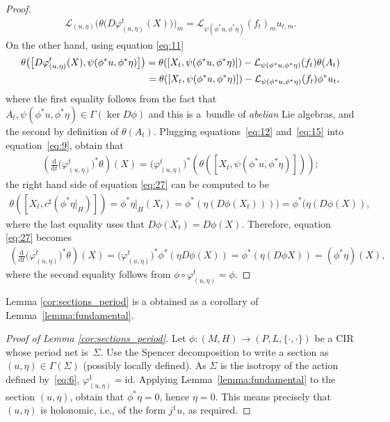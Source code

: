 \documentclass[pdftex]{sigma}
\numberwithin{equation}{section}
\newcommand{\de}{\mathrm{d}} %
\newcommand{\CM}{(M,H)} %
\begin{document}
\begin{proof}
 \begin{gather} \label{eq:12}
 \mathcal{L}_{(u,\eta)}\big( \theta\big(D \varphi^t_{(u,\eta)}(X)\big)\big)_m =\mathcal{L}_{\psi(\phi^*u,\phi^*\eta)}(f_t)_mu_{t,m}.
 \end{gather}
On the other hand, using equation \eqref{eq:11}
 \begin{gather}
\theta \big(\big[D\varphi^t_{(u,\eta)}(X), \psi(\phi^*u,\phi^*\eta)\big]\big) = \theta([X_t,\psi(\phi^*u,\phi^*\eta)]) - \mathcal{L}_{\psi(\phi^*u,\phi^*\eta)}(f_{t})\theta(A_{t})\nonumber\\
 \hphantom{\theta \big(\big[D\varphi^t_{(u,\eta)}(X), \psi(\phi^*u,\phi^*\eta)\big]\big)}{}
 = \theta([X_t,\psi(\phi^*u,\phi^*\eta)]) - \mathcal{L}_{\psi(\phi^*u,\phi^*\eta)}(f_{t}) \phi^* u_{t}, \label{eq:15}
\end{gather}
where the f\/irst equality follows from the fact that $A_{t}, \psi(\phi^*u,\phi^*\eta) \in \Gamma(\ker D\phi)$ and this is a~bundle of {\it abelian} Lie algebras, and the second by def\/inition of $\theta(A_{t})$. Plugging equations~\eqref{eq:12} and~\eqref{eq:15} into equation~\eqref{eq:9}, obtain that
 \begin{gather} \label{eq:27}
 \left( \frac{\de}{\de t} \big(\varphi^t_{(u,\eta)}\big)^* \theta\right)(X)
 = \big(\varphi^t_{(u,\eta)}\big)^*(\theta([X_t,\psi(\phi^*u,\phi^*\eta)]));
 \end{gather}
the right hand side of equation \eqref{eq:27} can be computed to be
 \begin{gather*}
 \theta([X_t,c^{\sharp}( \phi^* \eta \rvert_H)]) = \phi^*\eta \rvert_H(X_t) = \phi^*(\eta(D\phi(X_t)))) = \phi^*(\eta(D\phi(X)),
 \end{gather*}
where the last equality uses that $D\phi(X_t) = D\phi(X)$. Therefore, equation \eqref{eq:27} becomes
 \begin{gather*}
 \left( \frac{\de}{\de t} \big(\varphi^t_{(u,\eta)}\big)^* \theta\right)(X) = \big(\varphi^t_{(u,\eta)}\big)^* \phi^*(\eta
 D\phi(X)) = \phi^*(\eta (D\phi X)) = (\phi^*\eta)(X), \end{gather*}
where the second equality follows from $\phi \circ \varphi^t_{(u,\eta)} = \phi$.
\end{proof}

Lemma \ref{cor:sections_period} is a obtained as a corollary of Lemma~\ref{lemma:fundamental}.

\begin{proof}[Proof of Lemma \ref{cor:sections_period}] Let $\phi\colon \CM\to(P,L,\{\cdot,\cdot\})$ be a CIR whose period net is~$\Sigma$. Use the Spencer decomposition to write a section as $(u,\eta) \in \Gamma(\Sigma)$ (possibly locally def\/ined). As $\Sigma$ is the isotropy of the action def\/ined by~\eqref{eq:6}, $\varphi^1_{(u,\eta)} = \mathrm{id}$. Applying Lemma~\ref{lemma:fundamental} to the section $(u,\eta)$, obtain that $\phi^*\eta= 0$, hence $\eta=0$. This means precisely that $(u,\eta)$ is holonomic, i.e., of the form $j^1 u$, as required.
\end{proof}
\end{document}
